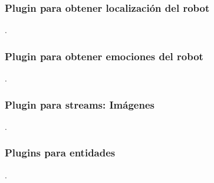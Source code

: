 \subsubsection{Plugin para obtener localización del robot}
 .

\subsubsection{Plugin para obtener emociones del robot}
 .

\subsubsection{Plugin para streams: Imágenes}
 .

\subsubsection{Plugins para entidades}
 .

